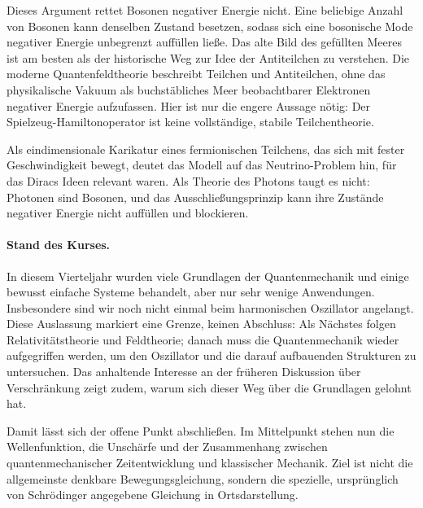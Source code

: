 Dieses Argument rettet Bosonen negativer Energie nicht. Eine beliebige Anzahl von Bosonen kann denselben Zustand besetzen, sodass sich eine bosonische Mode negativer Energie unbegrenzt auffüllen ließe. Das alte Bild des gefüllten Meeres ist am besten als der historische Weg zur Idee der Antiteilchen zu verstehen. Die moderne Quantenfeldtheorie beschreibt Teilchen und Antiteilchen, ohne das physikalische Vakuum als buchstäbliches Meer beobachtbarer Elektronen negativer Energie aufzufassen. Hier ist nur die engere Aussage nötig: Der Spielzeug-Hamiltonoperator ist keine vollständige, stabile Teilchentheorie.

Als eindimensionale Karikatur eines fermionischen Teilchens, das sich mit fester Geschwindigkeit bewegt, deutet das Modell auf das Neutrino-Problem hin, für das Diracs Ideen relevant waren. Als Theorie des Photons taugt es nicht: Photonen sind Bosonen, und das Ausschließungsprinzip kann ihre Zustände negativer Energie nicht auffüllen und blockieren.

\begin{classroomqa}
\end{classroomqa}

\paragraph{Stand des Kurses.}
In diesem Vierteljahr wurden viele Grundlagen der Quantenmechanik und einige bewusst einfache Systeme behandelt, aber nur sehr wenige Anwendungen. Insbesondere sind wir noch nicht einmal beim harmonischen Oszillator angelangt. Diese Auslassung markiert eine Grenze, keinen Abschluss: Als Nächstes folgen Relativitätstheorie und Feldtheorie; danach muss die Quantenmechanik wieder aufgegriffen werden, um den Oszillator und die darauf aufbauenden Strukturen zu untersuchen. Das anhaltende Interesse an der früheren Diskussion über Verschränkung zeigt zudem, warum sich dieser Weg über die Grundlagen gelohnt hat.

Damit lässt sich der offene Punkt abschließen. Im Mittelpunkt stehen nun die Wellenfunktion, die Unschärfe und der Zusammenhang zwischen quantenmechanischer Zeitentwicklung und klassischer Mechanik. Ziel ist nicht die allgemeinste denkbare Bewegungsgleichung, sondern die spezielle, ursprünglich von Schr\"odinger angegebene Gleichung in Ortsdarstellung.

